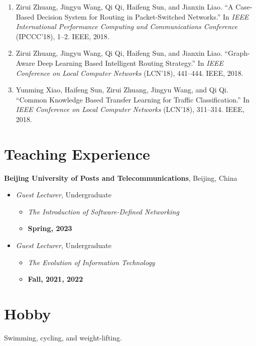 \documentclass[letterpaper,11pt]{article}
\newcommand{\contentlength}{5.25in} %
\begin{document}
\begin{tcolorbox}[flush right,breakable,colback=white,colframe=white,width=\contentlength]
\begin{enumerate}[itemsep=0mm]
			\item Zirui Zhuang, Jingyu Wang, Qi Qi, Haifeng Sun, and Jianxin Liao. “A Case-Based Decision System for Routing in Packet-Switched Networks.” In \textit{IEEE International Performance Computing and Communications Conference} (IPCCC'18), 1–2. IEEE, 2018.
			\item Zirui Zhuang, Jingyu Wang, Qi Qi, Haifeng Sun, and Jianxin Liao. “Graph-Aware Deep Learning Based Intelligent Routing Strategy.” In \textit{IEEE Conference on Local Computer Networks} (LCN'18), 441–444. IEEE, 2018.
			\item Yunming Xiao, Haifeng Sun, Zirui Zhuang, Jingyu Wang, and Qi Qi. “Common Knowledge Based Transfer Learning for Traffic Classification.” In \textit{IEEE Conference on Local Computer Networks} (LCN'18), 311–314. IEEE, 2018.
		\end{enumerate}
		
	\end{tcolorbox}

	
	
	
	
	\section{\textbf{Teaching Experience}}
	\begin{tcolorbox}[flush right,breakable,colback=white,colframe=white,width=\contentlength]
		\textbf{Beijing University of Posts and Telecommunications}, Beijing, China
		\begin{itemize}[itemsep=0mm]
			\item \textit{Guest Lecturer}, Undergraduate 
			\begin{itemize}[itemsep=0mm]
				\item \textit{The Introduction of Software-Defined Networking}
				\item  \textbf{Spring, 2023}
			\end{itemize}
	
			\item \textit{Guest Lecturer}, Undergraduate 
			\begin{itemize}[itemsep=0mm]
				\item \textit{The Evolution of Information Technology}	
				\item \textbf{Fall, 2021, 2022}
			\end{itemize}
		\end{itemize}
	\end{tcolorbox}
	
	
	
	\section{\textbf{Hobby}}
	\begin{tcolorbox}[flush right,breakable,colback=white,colframe=white,width=\contentlength]
		Swimming, cycling, and weight-lifting.
		
	\end{tcolorbox}
	
	
	
\end{document}
